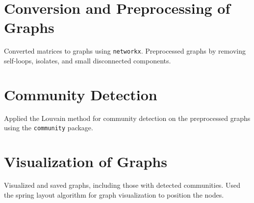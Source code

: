 \section{Conversion and Preprocessing of Graphs}
Converted matrices to graphs using \texttt{networkx}. Preprocessed graphs by removing self-loops, isolates, and small disconnected components.

\section{Community Detection}
Applied the Louvain method for community detection on the preprocessed graphs using the \texttt{community} package.

\section{Visualization of Graphs}
Visualized and saved graphs, including those with detected communities. Used the spring layout algorithm for graph visualization to position the nodes. 

